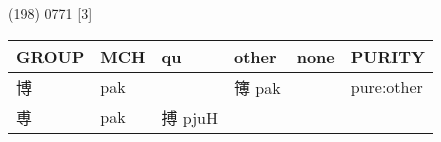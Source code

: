 \documentclass[14pt,a4paper]{scrartcl}
\begin{document}
(198) 0771 {[}3{]}

\begin{longtable}[c]{@{}llllll@{}}
\toprule
\begin{minipage}[b]{0.14\columnwidth}\raggedright\strut
GROUP
\strut\end{minipage} &
\begin{minipage}[b]{0.14\columnwidth}\raggedright\strut
MCH
\strut\end{minipage} &
\begin{minipage}[b]{0.14\columnwidth}\raggedright\strut
qu
\strut\end{minipage} &
\begin{minipage}[b]{0.14\columnwidth}\raggedright\strut
other
\strut\end{minipage} &
\begin{minipage}[b]{0.14\columnwidth}\raggedright\strut
none
\strut\end{minipage} &
\begin{minipage}[b]{0.14\columnwidth}\raggedright\strut
PURITY
\strut\end{minipage}\tabularnewline
\midrule
\endhead
\begin{minipage}[t]{0.14\columnwidth}\raggedright\strut
博
\strut\end{minipage} &
\begin{minipage}[t]{0.14\columnwidth}\raggedright\strut
pak
\strut\end{minipage} &
\begin{minipage}[t]{0.14\columnwidth}\raggedright\strut
\strut\end{minipage} &
\begin{minipage}[t]{0.14\columnwidth}\raggedright\strut
簙 pak
\strut\end{minipage} &
\begin{minipage}[t]{0.14\columnwidth}\raggedright\strut
\strut\end{minipage} &
\begin{minipage}[t]{0.14\columnwidth}\raggedright\strut
pure:other
\strut\end{minipage}\tabularnewline
\begin{minipage}[t]{0.14\columnwidth}\raggedright\strut
尃
\strut\end{minipage} &
\begin{minipage}[t]{0.14\columnwidth}\raggedright\strut
pak
\strut\end{minipage} &
\begin{minipage}[t]{0.14\columnwidth}\raggedright\strut
搏 pjuH
\strut\end{minipage} &

\end{longtable}
\end{document}
